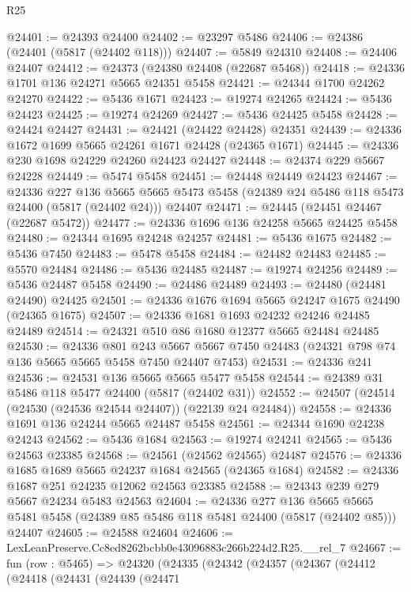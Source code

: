 \begin{lexlean}{R25}
\begin{coremodule}
@24401 := @24393 @24400
@24402 := @23297 @5486
@24406 := @24386 (@24401 (@5817 (@24402 @118)))
@24407 := @5849 @24310
@24408 := @24406 @24407
@24412 := @24373 (@24380 @24408 (@22687 @5468))
@24418 := @24336 @1701 @136 @24271 @5665 @24351 @5458
@24421 := @24344 @1700 @24262 @24270
@24422 := @5436 @1671
@24423 := @19274 @24265
@24424 := @5436 @24423
@24425 := @19274 @24269
@24427 := @5436 @24425 @5458
@24428 := @24424 @24427
@24431 := @24421 (@24422 @24428) @24351
@24439 := @24336 @1672 @1699 @5665 @24261 @1671 @24428 (@24365 @1671)
@24445 := @24336 @230 @1698 @24229 @24260 @24423 @24427
@24448 := @24374 @229 @5667 @24228
@24449 := @5474 @5458
@24451 := @24448 @24449 @24423
@24467 := @24336
    @227
    @136
    @5665
    @5665
    @5473
    @5458
    (@24389 @24 @5486 @118 @5473 @24400 (@5817 (@24402 @24)))
    @24407
@24471 := @24445 (@24451 @24467 (@22687 @5472))
@24477 := @24336 @1696 @136 @24258 @5665 @24425 @5458
@24480 := @24344 @1695 @24248 @24257
@24481 := @5436 @1675
@24482 := @5436 @7450
@24483 := @5478 @5458
@24484 := @24482 @24483
@24485 := @5570 @24484
@24486 := @5436 @24485
@24487 := @19274 @24256
@24489 := @5436 @24487 @5458
@24490 := @24486 @24489
@24493 := @24480 (@24481 @24490) @24425
@24501 := @24336 @1676 @1694 @5665 @24247 @1675 @24490 (@24365 @1675)
@24507 := @24336 @1681 @1693 @24232 @24246 @24485 @24489
@24514 := @24321 @510 @86 @1680 @12377 @5665 @24484 @24485
@24530 := @24336
    @801
    @243
    @5667
    @5667
    @7450
    @24483
    (@24321 @798 @74 @136 @5665 @5665 @5458 @7450 @24407 @7453)
@24531 := @24336 @241
@24536 := @24531 @136 @5665 @5665 @5477 @5458
@24544 := @24389 @31 @5486 @118 @5477 @24400 (@5817 (@24402 @31))
@24552 := @24507 (@24514 (@24530 (@24536 @24544 @24407)) (@22139 @24 @24484))
@24558 := @24336 @1691 @136 @24244 @5665 @24487 @5458
@24561 := @24344 @1690 @24238 @24243
@24562 := @5436 @1684
@24563 := @19274 @24241
@24565 := @5436 @24563 @23385
@24568 := @24561 (@24562 @24565) @24487
@24576 := @24336 @1685 @1689 @5665 @24237 @1684 @24565 (@24365 @1684)
@24582 := @24336 @1687 @251 @24235 @12062 @24563 @23385
@24588 := @24343 @239 @279 @5667 @24234 @5483 @24563
@24604 := @24336
    @277
    @136
    @5665
    @5665
    @5481
    @5458
    (@24389 @85 @5486 @118 @5481 @24400 (@5817 (@24402 @85)))
    @24407
@24605 := @24588 @24604
@24606 := LexLeanPreserve.Cc8ed8262bcbb0e43096883c266b224d2.R25.__rel_7
@24667 := fun (row : @5465) =>
  @24320
    (@24335
      (@24342
        (@24357
          (@24367
            (@24412
              (@24418
                (@24431
                  (@24439
                    (@24471

\end{coremodule}
\end{lexlean}
